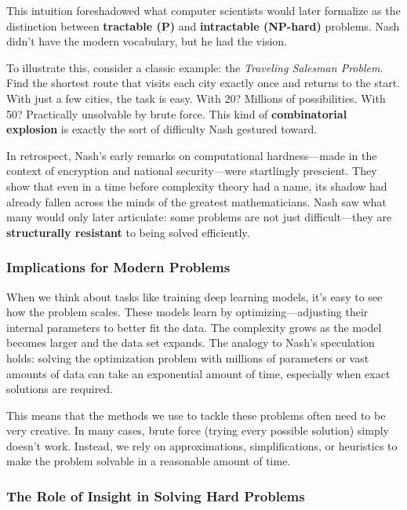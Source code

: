 This intuition foreshadowed what computer scientists would later formalize as the distinction between \textbf{tractable (P)} and \textbf{intractable (NP-hard)} problems. Nash didn’t have the modern vocabulary, but he had the vision.

To illustrate this, consider a classic example: the \textit{Traveling Salesman Problem}. Find the shortest route that visits each city exactly once and returns to the start. With just a few cities, the task is easy. With 20? Millions of possibilities. With 50? Practically unsolvable by brute force. This kind of \textbf{combinatorial explosion} is exactly the sort of difficulty Nash gestured toward.

\medskip

In retrospect, Nash’s early remarks on computational hardness—made in the context of encryption and national security—were startlingly prescient. They show that even in a time before complexity theory had a name, its shadow had already fallen across the minds of the greatest mathematicians. Nash saw what many would only later articulate: some problems are not just difficult—they are \textbf{structurally resistant} to being solved efficiently.


\subsubsection{Implications for Modern Problems}

When we think about tasks like training deep learning models, it’s easy to see how the problem scales. These models learn by optimizing—adjusting their internal parameters to better fit the data. The complexity grows as the model becomes larger and the data set expands. The analogy to Nash’s speculation holds: solving the optimization problem with millions of parameters or vast amounts of data can take an exponential amount of time, especially when exact solutions are required.

This means that the methods we use to tackle these problems often need to be very creative. In many cases, brute force (trying every possible solution) simply doesn’t work. Instead, we rely on approximations, simplifications, or heuristics to make the problem solvable in a reasonable amount of time.

\subsubsection{The Role of Insight in Solving Hard Problems}

